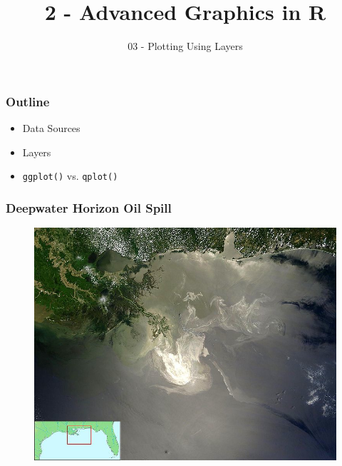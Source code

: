\documentclass{beamer}\usepackage[]{graphicx}\usepackage[]{color}
\title[Advanced Graphics in R]{2 - Advanced Graphics in R}
\subtitle{03 - Plotting Using Layers}
\author[ ]{}
\date{\hspace{1in}}
\institute[ISU]{Iowa State University}
\begin{document}
\begin{frame}
    \maketitle
\end{frame}


\begin{frame}
\frametitle{Outline}
\begin{itemize}
    \item Data Sources
    \item Layers
    \item \texttt{ggplot()} vs. \texttt{qplot()}
\end{itemize}    
\end{frame}




\begin{frame}[fragile]
\frametitle{Deepwater Horizon Oil Spill}

\begin{figure}[hbtp]\centering
\includegraphics[keepaspectratio=true, width=.85\linewidth]{figure/satelitepicBPoilspill.png}
\end{figure}

\end{frame}


\end{document}
